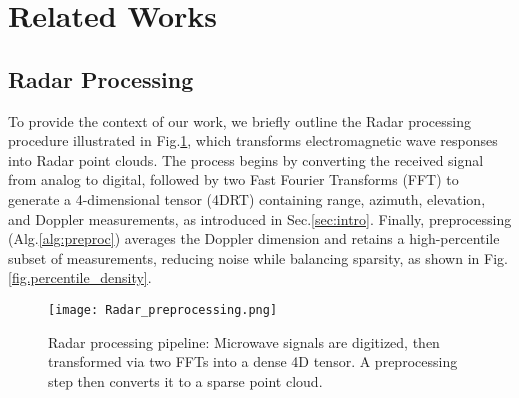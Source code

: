 \section{Related Works}
\subsection{Radar Processing}
To provide the context of our work, we briefly outline the Radar processing procedure illustrated in Fig.\ref{fig.Radar processing}, which transforms electromagnetic wave responses into Radar point clouds. The process begins by converting the received signal from analog to digital, followed by two Fast Fourier Transforms (FFT) to generate a 4-dimensional tensor (4DRT) containing range, azimuth, elevation, and Doppler measurements, as introduced in Sec.\ref{sec:intro}. Finally, preprocessing (Alg.\ref{alg:preproc}) averages the Doppler dimension and retains a high-percentile subset of measurements, reducing noise while balancing sparsity, as shown in Fig.\ref{fig.percentile_density}.

\begin{figure}[h]
    \centerline{\texttt{[image: Radar\_preprocessing.png]}}
    \caption{
        Radar processing pipeline: Microwave signals are digitized, then transformed via two FFTs into a dense 4D tensor. A preprocessing step then converts it to a sparse point cloud.
    }
    \label{fig.Radar processing}
\end{figure}

